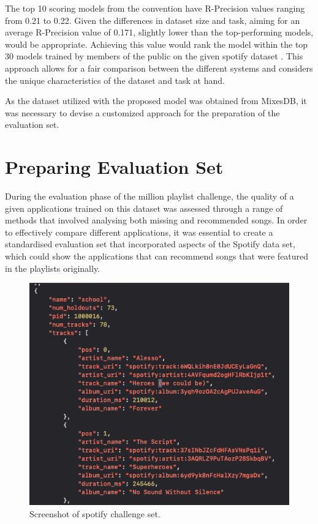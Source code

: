 The top 10 scoring models from the convention have R-Precision values ranging from 0.21 to 0.22. Given the differences in dataset size and task, aiming for an average R-Precision value of 0.171, slightly lower than the top-performing models, would be appropriate. Achieving this value would rank the model within the top 30 models trained by members of the public on the given spotify dataset \citep{aicrowd_aicrowd_2023}. This approach allows for a fair comparison between the different systems and considers the unique characteristics of the dataset and task at hand. 

As the dataset utilized with the proposed model was obtained from MixesDB, it was necessary to devise a customized approach for the preparation of the evaluation set.

\section{Preparing Evaluation Set}
During the evaluation phase of the million playlist challenge, the quality of a given applications trained on this dataset was assessed through a range of methods that involved analysing both missing and recommended songs. In order to effectively compare different applications, it was essential to create a standardised evaluation set that incorporated aspects of the Spotify data set, which could show the applications that can recommend songs that were featured in the playlists originally.

\begin{figure}[H]
	\includegraphics[scale=0.5]{images/spotify_challenge_set}
	\centering
	\caption{Screenshot of spotify challenge set. \citep{aicrowd_aicrowd_2023}} 
\end{figure}

